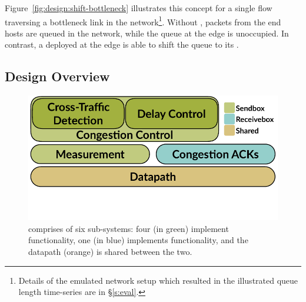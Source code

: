 Figure~\ref{fig:design:shift-bottleneck} illustrates this concept for a single flow traversing a bottleneck link in the 
network\footnote{Details of the emulated network setup which resulted in the illustrated queue length time-series are in \S\ref{s:eval}.}.
Without \name, packets from the end hosts are queued in the network, while the queue at the edge is unoccupied. 
In contrast, a \name deployed at the edge is able to shift the queue to its \inbox.

\subsection{Design Overview}\label{s:design:overview}
\begin{figure}
    \centering
    \includegraphics[width=\columnwidth]{img/arch-block-diag}
    \vspace{-40pt}
    \caption{\name comprises of six sub-systems: four (in green) implement \inbox functionality, one (in blue) implements \outbox functionality, and the datapath (orange) is shared between the two.}\label{fig:design:block-diag}
\end{figure}


